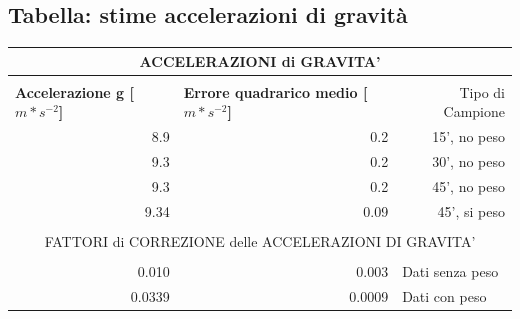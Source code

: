 \documentclass[12pt]{article} %
\begin{document}
	\subsection {Tabella: stime accelerazioni di gravità}
		\begin{table}[H]
		\begin{tabular}{|r|l|r|}
		\hline
		\multicolumn{ 3}{|c|}{\textbf{ACCELERAZIONI di GRAVITA'}} \\ \hline
		\multicolumn{ 3}{|c|}{} \\ \hline
		\multicolumn{1}{|l|}{\textbf{Accelerazione g [$m*s^{-2}$]}} & \textbf{Errore quadrarico medio [$m*s^{-2}$]} & Tipo di Campione \\ \hline
		8.9 & \multicolumn{1}{r|}{0.2} & 15', no peso \\ \hline
		9.3 & \multicolumn{1}{r|}{0.2} & 30', no peso \\ \hline
		9.3 & \multicolumn{1}{r|}{0.2} & 45', no peso \\ \hline
		9.34 & \multicolumn{1}{r|}{0.09} & 45', si peso \\ \hline
		\multicolumn{ 3}{|c|}{} \\ \hline
		\multicolumn{ 3}{|c|}{FATTORI di CORREZIONE delle ACCELERAZIONI DI GRAVITA'} \\ \hline
		\multicolumn{ 3}{|c|}{} \\ \hline
		0.010 & \multicolumn{1}{r|}{0.003} & \multicolumn{1}{l|}{Dati senza peso} \\ \hline
		0.0339 & \multicolumn{1}{r|}{0.0009} & \multicolumn{1}{l|}{Dati con peso} \\ \hline
		\end{tabular}
		\label{tabstimegrav}
		\end{table}
\end{document}
